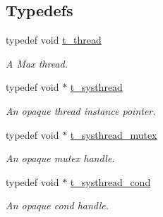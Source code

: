 \subsection*{Typedefs}
\begin{DoxyCompactItemize}
\item 
\hypertarget{group__threading_ga3f508e817912b65c30d97339cf7a6e62}{
typedef void \hyperlink{group__threading_ga3f508e817912b65c30d97339cf7a6e62}{t\_\-thread}}
\label{group__threading_ga3f508e817912b65c30d97339cf7a6e62}

\begin{DoxyCompactList}\small\item\em A Max thread. \item\end{DoxyCompactList}\item 
\hypertarget{group__threading_gaaf0068b8e9ac28430873484727029315}{
typedef void $\ast$ \hyperlink{group__threading_gaaf0068b8e9ac28430873484727029315}{t\_\-systhread}}
\label{group__threading_gaaf0068b8e9ac28430873484727029315}

\begin{DoxyCompactList}\small\item\em An opaque thread instance pointer. \item\end{DoxyCompactList}\item 
\hypertarget{group__threading_ga503de6f3f546ef1dd2bed57a13d9812c}{
typedef void $\ast$ \hyperlink{group__threading_ga503de6f3f546ef1dd2bed57a13d9812c}{t\_\-systhread\_\-mutex}}
\label{group__threading_ga503de6f3f546ef1dd2bed57a13d9812c}

\begin{DoxyCompactList}\small\item\em An opaque mutex handle. \item\end{DoxyCompactList}\item 
\hypertarget{group__threading_ga56cc95a6cbd27fada3a74b85a7bc3155}{
typedef void $\ast$ \hyperlink{group__threading_ga56cc95a6cbd27fada3a74b85a7bc3155}{t\_\-systhread\_\-cond}}
\label{group__threading_ga56cc95a6cbd27fada3a74b85a7bc3155}

\begin{DoxyCompactList}\small\item\em An opaque cond handle. \item\end{DoxyCompactList}\end{DoxyCompactItemize}
